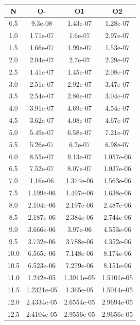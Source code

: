 \begin{center}
\begin{tabular}{| c | c | c | c |}
\hline
\textbf{N} & \textbf{O-} & \textbf{O1} & \textbf{O2} \\ \hline
0.5 & 9.3e-08 & 1.43e-07 & 1.28e-07 \\ \hline
1.0 & 1.71e-07 & 1.6e-07 & 2.97e-07 \\ \hline
1.5 & 1.66e-07 & 1.99e-07 & 1.53e-07 \\ \hline
2.0 & 2.04e-07 & 2.7e-07 & 2.29e-07 \\ \hline
2.5 & 1.41e-07 & 1.45e-07 & 2.08e-07 \\ \hline
3.0 & 2.51e-07 & 2.92e-07 & 3.47e-07 \\ \hline
3.5 & 2.54e-07 & 2.86e-07 & 3.04e-07 \\ \hline
4.0 & 3.91e-07 & 4.69e-07 & 4.54e-07 \\ \hline
4.5 & 3.62e-07 & 4.08e-07 & 4.67e-07 \\ \hline
5.0 & 5.49e-07 & 6.58e-07 & 7.21e-07 \\ \hline
5.5 & 5.26e-07 & 6.2e-07 & 6.98e-07 \\ \hline
6.0 & 8.55e-07 & 9.13e-07 & 1.057e-06 \\ \hline
6.5 & 7.52e-07 & 8.07e-07 & 1.037e-06 \\ \hline
7.0 & 1.16e-06 & 1.374e-06 & 1.563e-06 \\ \hline
7.5 & 1.199e-06 & 1.497e-06 & 1.638e-06 \\ \hline
8.0 & 2.104e-06 & 2.197e-06 & 2.487e-06 \\ \hline
8.5 & 2.187e-06 & 2.384e-06 & 2.744e-06 \\ \hline
9.0 & 3.666e-06 & 3.97e-06 & 4.553e-06 \\ \hline
9.5 & 3.732e-06 & 3.788e-06 & 4.352e-06 \\ \hline
10.0 & 6.565e-06 & 7.148e-06 & 8.174e-06 \\ \hline
10.5 & 6.523e-06 & 7.279e-06 & 8.151e-06 \\ \hline
11.0 & 1.242e-05 & 1.3911e-05 & 1.5101e-05 \\ \hline
11.5 & 1.2321e-05 & 1.365e-05 & 1.5014e-05 \\ \hline
12.0 & 2.4334e-05 & 2.6554e-05 & 2.9694e-05 \\ \hline
12.5 & 2.4104e-05 & 2.9556e-05 & 2.9656e-05 \\ \hline
\hline
\end{tabular}
\end{center}
